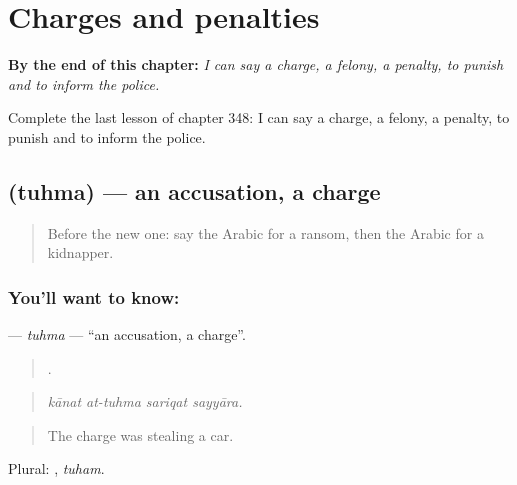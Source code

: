 
\chapter{Charges and penalties}
\label{ch:ar-charges-and-penalties}

\begin{chapteropening}
\textbf{By the end of this chapter:} \emph{I can say a charge, a felony, a penalty, to punish and to inform the police.}

Complete the last lesson of chapter 348: I can say a charge, a felony, a penalty, to punish and to inform the police.
\end{chapteropening}

\section[\texorpdfstring{\ar{تهمة} (tuhma)}{تهمة (tuhma)}]{ (tuhma) — an accusation, a charge}

\label{lesson:AR-C348-tuhma}



\begin{quote}
Before the new one: say the Arabic for a ransom, then the Arabic for a kidnapper.
\end{quote}

\subsection*{You'll want to know: }
\textbf{} — \emph{tuhma} — \textquotedblleft{}an accusation, a charge\textquotedblright{}.

\begin{quote}
   .
\end{quote}

\begin{quote}
\emph{kānat at-tuhma sariqat sayyāra.}
\end{quote}

\begin{quote}
The charge was stealing a car.
\end{quote}

Plural: , \emph{tuham}.

